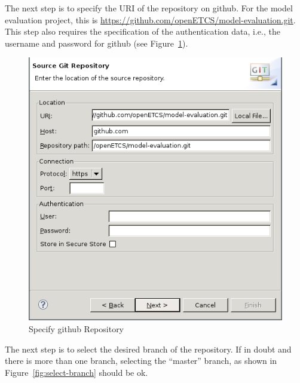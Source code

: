 \documentclass[10pt,a4paper]{article}
\newcommand{\skalierung}{.6}
\begin{document}
The next step is to specify the URI of the repository on github. For the
model evaluation project, this is
\url{https://github.com/openETCS/model-evaluation.git}. This step also requires
the specification of the authentication data, i.e., the username and password
for github (see Figure~\ref{fig:specify-git-repo}).

\begin{figure}[H]
  \centering
  \includegraphics[width=\skalierung\textwidth]{project_import_step3}
  \caption{Specify github Repository}
  \label{fig:specify-git-repo}
\end{figure}

The next step is to select the desired branch of the repository. If in doubt and
there is more than one branch, selecting the ``master'' branch, as shown in
Figure~\ref{fig:select-branch} should be ok.
\end{document}
